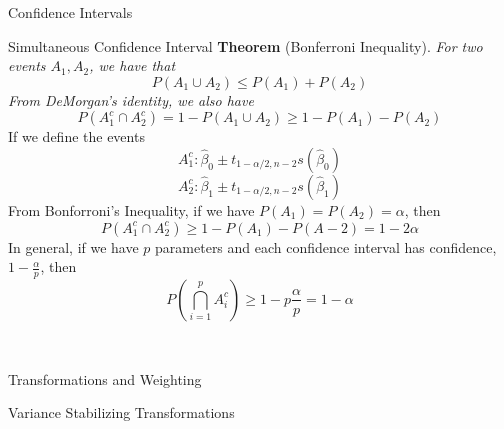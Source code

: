 \documentclass{article}
\begin{document}
\begin{multicols*}{3}
\begin{blackbox}{Confidence Intervals}
        \begin{redbox}{Simultaneous Confidence Interval}
            \textbf{Theorem} (Bonferroni Inequality). \textit{
                For two events $A_1, A_2$, we have that\\[-2ex]
                \[P(A_1 \cup A_2) \leq P(A_1) + P(A_2)\]
                From DeMorgan's identity, we also have \\[-2ex]
                \[P(A_1^c \cap A_2^c) = 1 - P(A_1 \cup A_2) \geq 1 - P(A_1) - P(A_2)\]
            }
            \noindent
            If we define the events \\[-2ex]
            \[A_1^c: \hat{\beta}_0 \pm t_{1-\alpha/2, n-2}s(\hat{\beta}_0)\]
            \[A_2^c: \hat{\beta}_1 \pm t_{1-\alpha/2, n-2}s(\hat{\beta}_1)\]
            From Bonforroni's Inequality, if we have $P(A_1) = P(A_2) = \alpha$, then \\[-2ex]
            \[P(A_1^c \cap A_2^c) \geq 1 - P(A_1) - P(A-2) = 1 - 2\alpha\]
            In general, if we have $p$ parameters and each confidence interval has confidence, $1- \frac{\alpha}{p}$, then \\[-2ex]
            \[P\left(\bigcap_{i=1}^p A_i^c\right) \geq 1 - p\frac{\alpha}{p} = 1 - \alpha\]
        \end{redbox}\\[-2ex]
    \end{blackbox}
    \begin{blackbox}{Transformations and Weighting}
        \begin{redbox}{Variance Stabilizing Transformations}

\end{redbox}
\end{blackbox}
\end{multicols*}
\end{document}

